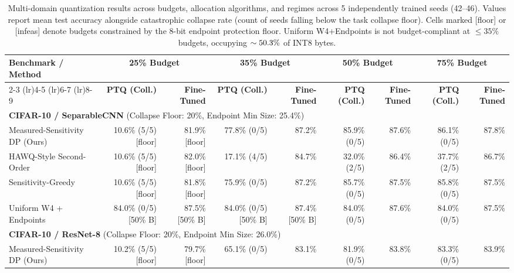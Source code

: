 \begin{table}[!t]
\centering
\caption{Multi-domain quantization results across budgets, allocation algorithms, and regimes across 5 independently trained seeds (42--46). Values report mean test accuracy alongside catastrophic collapse rate (count of seeds falling below the task collapse floor). Cells marked [floor] or [infeas] denote budgets constrained by the 8-bit endpoint protection floor. Uniform W4+Endpoints is not budget-compliant at $\le 35\%$ budgets, occupying $\sim 50.3\%$ of INT8 bytes.}
\label{tab:full_matrix}
\scriptsize
\setlength{\tabcolsep}{2.5pt}
\begin{tabular}{lrrrrrrrr}
\toprule
\textbf{Benchmark / Method} & \multicolumn{2}{c}{\textbf{25\% Budget}} & \multicolumn{2}{c}{\textbf{35\% Budget}} & \multicolumn{2}{c}{\textbf{50\% Budget}} & \multicolumn{2}{c}{\textbf{75\% Budget}} \\
\cmidrule(lr){2-3} \cmidrule(lr){4-5} \cmidrule(lr){6-7} \cmidrule(lr){8-9}
 & \textbf{PTQ (Coll.)} & \textbf{Fine-Tuned} & \textbf{PTQ (Coll.)} & \textbf{Fine-Tuned} & \textbf{PTQ (Coll.)} & \textbf{Fine-Tuned} & \textbf{PTQ (Coll.)} & \textbf{Fine-Tuned} \\
\midrule
\multicolumn{9}{l}{\textbf{CIFAR-10 / SeparableCNN} (Collapse Floor: 20\%, Endpoint Min Size: 25.4\%)}\\
\quad Measured-Sensitivity DP (Ours) & 10.6\% (5/5) [floor] & 81.9\% [floor] & 77.8\% (0/5) & 87.2\% & 85.9\% (0/5) & 87.6\% & 86.1\% (0/5) & 87.8\% \\
\quad HAWQ-Style Second-Order & 10.6\% (5/5) [floor] & 82.0\% [floor] & 17.1\% (4/5) & 84.7\% & 32.0\% (2/5) & 86.4\% & 37.7\% (2/5) & 86.7\% \\
\quad Sensitivity-Greedy & 10.6\% (5/5) [floor] & 81.8\% [floor] & 75.9\% (0/5) & 87.2\% & 85.7\% (0/5) & 87.5\% & 85.8\% (0/5) & 87.5\% \\
\quad Uniform W4 + Endpoints & 84.0\% (0/5) [50\% B] & 87.5\% [50\% B] & 84.0\% (0/5) [50\% B] & 87.4\% [50\% B] & 84.0\% (0/5) & 87.6\% & 84.0\% (0/5) & 87.5\% \\
\midrule
\multicolumn{9}{l}{\textbf{CIFAR-10 / ResNet-8} (Collapse Floor: 20\%, Endpoint Min Size: 26.0\%)}\\
\quad Measured-Sensitivity DP (Ours) & 10.2\% (5/5) [floor] & 79.7\% [floor] & 65.1\% (0/5) & 83.1\% & 81.9\% (0/5) & 83.8\% & 83.3\% (0/5) & 83.9\% \\

\end{tabular}
\end{table}
